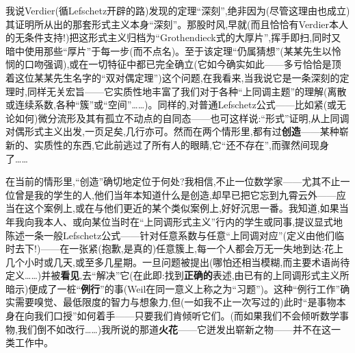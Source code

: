 我说Verdier(循Lefschetz开辟的路)发现的定理“深刻”,绝非因为(尽管这理由也成立)其证明所从出的那套形式主义本身“深刻”。那股时风,早就(而且恰恰有Verdier本人的无条件支持!)把这形式主义归档为“Grothendieck式的大厚片”,挥手即扫,同时又暗中使用那些“厚片”于每一步(而不点名)。至于该定理“仍属猜想”(某某先生以怜悯的口吻强调),或在一切特征中都已完全确立(它如今确实如此——多亏恰恰是顶着这位某某先生名字的“双对偶定理”)这个问题,在我看来,当我说它是一条深刻的定理时,同样无关宏旨——它实质性地丰富了我们对于各种“上同调主题”的理解(离散或连续系数,各种“簇”或“空间”……)。同样的,对普通Lefschetz公式——比如紧(或无论如何)微分流形及其有孤立不动点的自同态——也可这样说:“形式”证明,从上同调对偶形式主义出发,一页足矣,几行亦可。然而在两个情形里,都有过\textbf{创造}——某种崭新的、实质性的东西,它此前逃过了所有人的眼睛,它“还不存在”,而骤然间现身了……

在当前的情形里,“创造”确切地定位于何处?我相信,不止一位数学家——尤其不止一位曾是我的学生的人,他们当年本知道什么是创造,却早已把它忘到九霄云外——应当在这个案例上,或在与他们更近的某个类似案例上,好好沉思一番。我知道,如果当年我向我本人、或向某位当时在“上同调形式主义”行内的学生或同事,提议显式地陈述一条一般Lefschetz公式——针对任意系数与任意“上同调对应”(定义由他们临时去下!)——在一张紧(抱歉,是真的)任意\dmark{}簇上,每一个人都会万无一失地到达:花上几个小时或几天,或至多几星期。一旦问题被提出(哪怕还相当模糊,而主要术语尚待定义……)并被\textbf{看见},去“解决”它(在此即:找到\textbf{正确的}表述,由已有的上同调形式主义所暗示)便成了一桩“\textbf{例行}”的事(Weil在同一意义上称之为“习题”)。这种“例行工作”确实需要嗅觉、最低限度的智力与想象力,但(一如我不止一次写过的)此时“是事物本身在向我们口授”如何着手——只要我们肯倾听它们。(而如果我们不会倾听数学事物,我们倒不如改行……)我所说的那道\textbf{火花}——它迸发出崭新之物——并不在这一类工作中。


